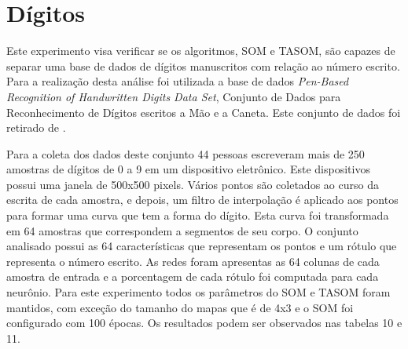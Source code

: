 \section{Dígitos}
Este experimento visa verificar se os algoritmos, SOM e TASOM, são capazes de separar uma base de dados de dígitos manuscritos com relação ao número escrito. Para a realização desta análise foi utilizada a base de dados \textit{Pen-Based Recognition of Handwritten Digits Data Set}, Conjunto de Dados para Reconhecimento de Dígitos escritos a Mão e a Caneta. Este conjunto de dados foi retirado de . 

Para a coleta dos dados deste conjunto 44 pessoas escreveram mais de 250 amostras de dígitos de 0 a 9 em um dispositivo eletrônico. Este dispositivos possui uma janela de 500x500 pixels. Vários pontos são coletados ao curso da escrita de cada amostra, e depois, um filtro de interpolação é aplicado aos pontos para formar uma curva que tem a forma do dígito. Esta curva foi transformada em 64 amostras que correspondem a segmentos de seu corpo. O conjunto analisado possui as 64 características que representam os pontos e um rótulo que representa o número escrito. As redes foram apresentas as 64 colunas de cada amostra de entrada e a porcentagem de cada rótulo foi computada para cada neurônio. Para este experimento todos os parâmetros do SOM e TASOM foram mantidos, com exceção do tamanho do mapas que é de 4x3 e o SOM foi configurado com 100 épocas. Os resultados podem ser observados nas tabelas 10 e 11.

